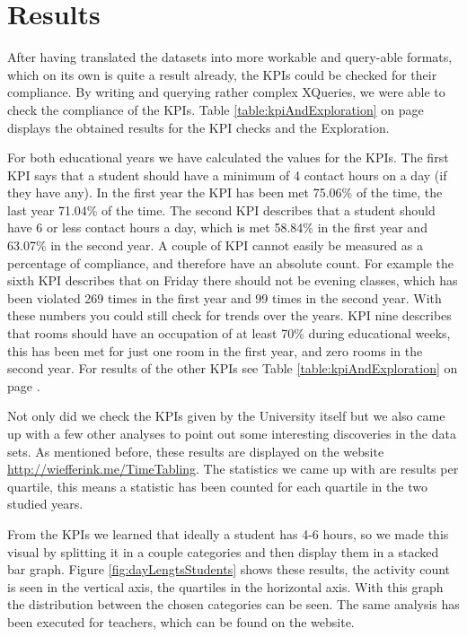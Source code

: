 \section{Results}
After having translated the datasets into more workable and query-able formats, which on its own is quite a result already, the KPIs could be checked for their compliance. By writing and querying rather complex XQueries, we were able to check the compliance of the KPIs. Table \ref{table:kpiAndExploration} on page \pageref{table:kpiAndExploration} displays the obtained results for the KPI checks and the Exploration.

For both educational years we have calculated the values for the KPIs. The first KPI says that a student should have a minimum of 4 contact hours on a day (if they have any). In the first year the KPI has been met 75.06\% of the time, the last year 71.04\% of the time. The second KPI describes that a student should have 6 or less contact hours a day, which is met 58.84\% in the first year and 63.07\% in the second year. A couple of KPI cannot easily be measured as a percentage of compliance, and therefore have an absolute count. For example the sixth KPI describes that on Friday there should not be evening classes, which has been violated 269 times in the first year and 99 times in the second year. With these numbers you could still check for trends over the years. KPI nine describes that rooms should have an occupation of at least 70\% during educational weeks, this has been met for just one room in the first year, and zero rooms in the second year. For results of the other KPIs see Table \ref{table:kpiAndExploration}  on page \pageref{table:kpiAndExploration}.

Not only did we check the KPIs given by the University itself but we also came up with a few other analyses to point out some interesting discoveries in the data sets. As mentioned before, these results are displayed on the website \url{http://wiefferink.me/TimeTabling}. The statistics we came up with are results per quartile, this means a statistic has been counted for each quartile in the two studied years.

From the KPIs we learned that ideally a student has 4-6 hours, so we made this visual by splitting it in a couple categories and then display them in a stacked bar graph. Figure \ref{fig:dayLengtsStudents} shows these results, the activity count is seen in the vertical axis, the quartiles in the horizontal axis. With this graph the distribution between the chosen categories can be seen. The same analysis has been executed for teachers, which can be found on the website.

